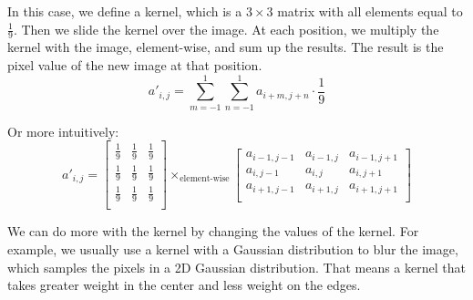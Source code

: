 \documentclass[a4paper,12pt]{article}
\begin{document}
In this case, we define a kernel, which is a $3 \times 3$ matrix with all elements equal to $\frac{1}{9}$.
Then we slide the kernel over the image.
At each position, we multiply the kernel with the image, element-wise, and sum up the results.
The result is the pixel value of the new image at that position.
\begin{equation*}
	a'_{i, j} = \sum_{m = -1}^{1} \sum_{n = -1}^{1} a_{i + m, j + n} \cdot \frac{1}{9}
\end{equation*}

Or more intuitively:
\begin{equation*}
	a'_{i, j} = 
	\begin{bmatrix}
		\frac{1}{9} & \frac{1}{9} & \frac{1}{9} \\
		\frac{1}{9} & \frac{1}{9} & \frac{1}{9} \\
		\frac{1}{9} & \frac{1}{9} & \frac{1}{9} \\
	\end{bmatrix}
	\times_{\text{element-wise}}
	\begin{bmatrix}
		a_{i-1, j-1} & a_{i-1, j} & a_{i-1, j+1} \\
		a_{i, j-1} & a_{i, j} & a_{i, j+1} \\
		a_{i+1, j-1} & a_{i+1, j} & a_{i+1, j+1} \\
	\end{bmatrix}
\end{equation*}

We can do more with the kernel by changing the values of the kernel.
For example, we usually use a kernel with a Gaussian distribution to blur the image, which samples the pixels in a 2D Gaussian distribution.
That means a kernel that takes greater weight in the center and less weight on the edges.
\end{document}
